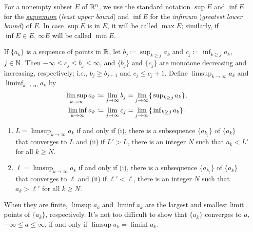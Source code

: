 For a nonempty subset $E$ of $\mathbb{R}^n$, we use the standard notation $\sup
E$ and $\inf E$ for the
\href{https://en.wikipedia.org/wiki/Infimum_and_supremum}{\emph{supremum}}
(\emph{least upper bound}) and $\inf E$ for the \emph{infimum}
(\emph{greatest lower bound}) of $E$. In case $\sup E$ is in $E$, it will
be called $\max E$; similarly, if $\inf E\in E$, $\infty E$ will be called
$\min E$.

If $\{a_k\}$ is a sequence of points in $\mathbb{R}$, let
$b_j\coloneqq\sup_{k\geq j} a_k$ and $c_j\coloneqq\inf_{k\geq j} a_k$,
$j\in\mathbb{N}$. Then $-\infty\leq c_j\leq b_j\leq\infty$, and $\{b_j\}$ and
$\{c_j\}$ are monotone decreasing and increasing, respectively; i.e.,
$b_j\geq b_{j+1}$ and $c_j\leq c_j+1$. Define $\limsup_{k\to\infty}a_k$ and
$\liminf_{k\to\infty}a_k$ by
\begin{equation}
\label{eq:limsup-liminf-definition}
\begin{aligned}
\limsup_{k\to\infty}a_k&\coloneqq\lim_{j\to\infty} b_j
=\lim_{j\to\infty}\{\sideset{}{_{k\geq j}}\sup a_k\},\\
\liminf_{k\to\infty}a_k&\coloneqq\lim_{j\to\infty} c_j
=\lim_{j\to\infty}\{\sideset{}{_{k\geq j}}\inf a_k\}.
\end{aligned}
\end{equation}

\begin{theorem}[1.4]
\hfill
\begin{enumerate}[label=\textnormal{(\alph*)},noitemsep]
\item $L=\limsup_{k\to\infty} a_k$ if and only if \textnormal{(i)}, there
  is a subsequence $\{a_{k_j}\}$ of $\{a_k\}$ that converges to $L$ and
  \textnormal{(ii)} if $L'>L$, there is an integer $N$ such that $a_k<L'$
  for all $k\geq N$.
\item $\ell=\limsup_{k\to\infty} a_k$ if and only if \textnormal{(i)}, there
  is a subsequence $\{a_{k_j}\}$ of $\{a_k\}$ that converges to $\ell$ and
  \textnormal{(ii)} if $\ell'<\ell$, there is an integer $N$ such that
  $a_k>\ell'$ for all $k\geq N$.
\end{enumerate}
\end{theorem}
When they are finite, $\limsup a_k$ and $\liminf a_k$ are the largest and
smallest limit points of $\{a_k\}$, respectively. It's not too difficult to
show that $\{a_k\}$ converges to $a$, $-\infty\leq a\leq\infty$, if and
only if $\limsup a_k=\liminf a_k$.


